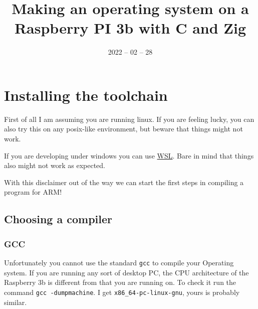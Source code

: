 \endofdump





\date{2022 -- 02 -- 28}
\title{Making an operating system on a Raspberry PI 3b with C and Zig}
\useTemplate[english]

\usepackage[outputdir=out]{minted}

\def\shell#1{\texttt{#1}}
\def\sh#1{\texttt{#1}}
\def\zig{\sh{zig}}




    \maketitle


    \section{Installing the toolchain}

    First of all I am assuming you are running linux.
    If you are feeling lucky, you can also try this on any posix-like environment, but beware that things might not work.

    If you are developing under windows you can use \href{https://docs.microsoft.com/en-us/windows/wsl/install}{WSL}.
    Bare in mind that things also might not work as expected.

    With this disclaimer out of the way we can start the first steps in compiling a program for ARM!

    \subsection{Choosing a compiler}

    \subsubsection{GCC}

    Unfortunately you cannot use the standard \shell{gcc} to compile your Operating system. If you are running any sort of desktop PC, the CPU architecture of the Raspberry 3b is
    different from that you are running on. To check it run the command \sh{gcc -dumpmachine}. I get \sh{x86_64-pc-linux-gnu}, yours is probably similar.

